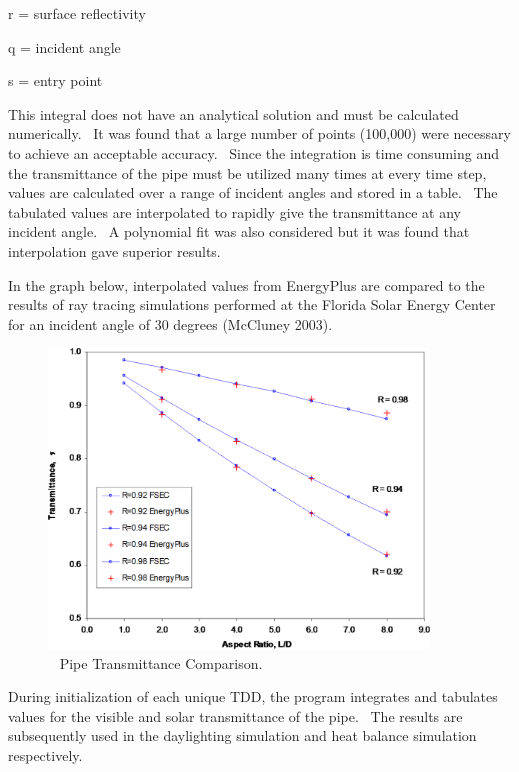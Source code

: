 r = surface reflectivity

q = incident angle

s = entry point

This integral does not have an analytical solution and must be calculated numerically.~ It was found that a large number of points (100,000) were necessary to achieve an acceptable accuracy.~ Since the integration is time consuming and the transmittance of the pipe must be utilized many times at every time step, values are calculated over a range of incident angles and stored in a table.~ The tabulated values are interpolated to rapidly give the transmittance at any incident angle.~ A polynomial fit was also considered but it was found that interpolation gave superior results.

In the graph below, interpolated values from EnergyPlus are compared to the results of ray tracing simulations performed at the Florida Solar Energy Center for an incident angle of 30 degrees (McCluney 2003).

\begin{figure}[hbtp] %
\centering
\includegraphics[width=0.9\textwidth, height=0.9\textheight, keepaspectratio=true]{media/image874.png}
\caption{  Pipe Transmittance Comparison. \protect \label{fig:pipe-transmittance-comparison.}}
\end{figure}

During initialization of each unique TDD, the program integrates and tabulates values for the visible and solar transmittance of the pipe.~ The results are subsequently used in the daylighting simulation and heat balance simulation respectively.

